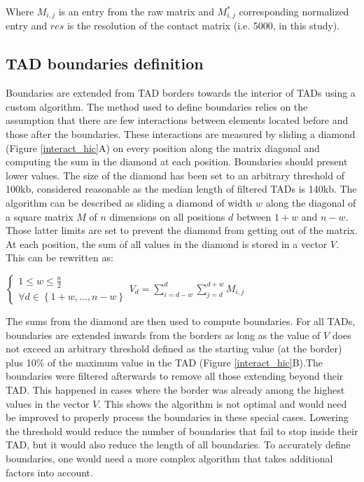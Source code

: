 \documentclass[11pt,a4paper]{report}
\begin{document}
\noindent Where $M_{i,j}$ is an entry from the raw matrix and $M^*_{i,j}$ corresponding normalized entry and $res$ is the resolution of the contact matrix (i.e. 5000, in this study).

\subsection*{TAD boundaries definition}

Boundaries are extended from TAD borders towards the interior of TADs using a custom algorithm. The method used to define boundaries relies on the assumption that there are few interactions between elements located before and those after the boundaries. These interactions are measured by sliding a diamond (Figure \ref{interact_hic}A) on every position along the matrix diagonal and computing the sum in the diamond at each position. Boundaries should present lower values. The size of the diamond has been set to an arbitrary threshold of 100kb, considered reasonable as the median length of filtered TADs is 140kb. 
The algorithm can be described as sliding a diamond of width $w$  along the diagonal of a square matrix $M$ of $n$ dimensions on all positions $d$ between $1+w$ and $n-w$. Those latter limits are set to prevent the diamond from getting out of the matrix. At each position, the sum of all values in the diamond is stored in a vector $V$. This can be rewritten as: 

\vspace{0.2in}
$\left\{\begin{matrix}1\leq w\leq \frac{n}{2} \\ \forall d\in\left \{ 1+w , ... , n-w \right \}\end{matrix}\right. V_{d}=\sum_{i=d-w}^{d}\sum_{j=d}^{d+w}M_{i,j}$
\vspace{0.2in}

\noindent The sums from the diamond are then used to compute boundaries. For all TADs, boundaries are extended inwards from the borders as long as the value of $V$ does not exceed an arbitrary threshold defined as the starting value (at the border) plus 10\% of the maximum value in the TAD (Figure \ref{interact_hic}B).The boundaries were filtered afterwards to remove all those extending beyond their TAD. This happened in cases where the border was already among the highest values in the vector $V$. This shows the algorithm is not optimal and would need be improved to properly process the boundaries in these special cases. Lowering the threshold would reduce the number of boundaries that fail to stop inside their TAD, but it would also reduce the length of all boundaries. To accurately define boundaries, one would need a more complex algorithm that takes additional factors into account.
\end{document}
